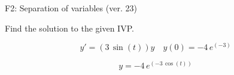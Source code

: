 \begin{exercise}
  \begin{exerciseTitle}F2: Separation of variables (ver. 23)\end{exerciseTitle}
  \begin{exerciseStatement}
    
Find the solution to the given IVP.

    
\[y'=( 3 \, \sin\left(t\right) )y\hspace{1em} y(0)= -4 \, e^{\left(-3\right)}\]

  \end{exerciseStatement}
  \begin{exerciseAnswer}
    
\[y= -4 \, e^{\left(-3 \, \cos\left(t\right)\right)}\]

  \end{exerciseAnswer}
\end{exercise}